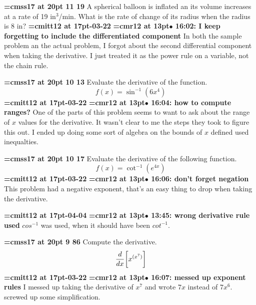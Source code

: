 {\medskip\noindent\bf\font\titlefont=cmss17 at 20pt 11 19}\medskip
A spherical balloon is inflated an its volume increases
at a rate of 19 in$^3$/min. What is the rate of change of its
radius when the radius is 8 in?
{\medskip\noindent\bf\font\titlefont=cmitt12 at 17pt-03-22}\medskip
{\smallskip\noindent\bf\font\titlefont=cmr12 at 13pt\titlefont $\bullet$ 16:02: I keep forgetting to include the differentiated component}\smallskip
In both the sample problem an the actual problem, I forgot about the second differential component when taking the derivative. I just treated it as the power rule on a variable, not the chain rule.
\par

{\medskip\noindent\bf\font\titlefont=cmss17 at 20pt 10 13}\medskip
Evaluate the derivative of the function.
$$\
f(x) = \sin^{-1}(6x^4)
$$
{\medskip\noindent\bf\font\titlefont=cmitt12 at 17pt-03-22}\medskip
{\smallskip\noindent\bf\font\titlefont=cmr12 at 13pt\titlefont $\bullet$ 16:04: how to compute ranges?}\smallskip
One of the parts of this problem seems to want to ask about the range of $x$ values for the derivative. It wasn't clear to me the steps they took to figure this out. I ended up doing some sort of algebra on the bounds of $x$ defined used inequalties.
\par

{\medskip\noindent\bf\font\titlefont=cmss17 at 20pt 10 17}\medskip
Evaluate the derivative of the following function.
$$\
f(x) = \cot^{-1}(e^{4x})
$$
{\medskip\noindent\bf\font\titlefont=cmitt12 at 17pt-03-22}\medskip
{\smallskip\noindent\bf\font\titlefont=cmr12 at 13pt\titlefont $\bullet$ 16:06: don't forget negation}\smallskip
This problem had a negative exponent, that's an easy thing to drop when taking the derivative.
\par

{\medskip\noindent\bf\font\titlefont=cmitt12 at 17pt-04-04}\medskip
{\smallskip\noindent\bf\font\titlefont=cmr12 at 13pt\titlefont $\bullet$ 13:45: wrong derivative rule used}\smallskip
$cos^{-1}$ was used, when it should have been $cot^{-1}$.
\par

{\medskip\noindent\bf\font\titlefont=cmss17 at 20pt 9 86}\medskip
Compute the derivative.
$$\
{d \over dx} \bigg[
x^{(x^7)}
\bigg]
$$
{\medskip\noindent\bf\font\titlefont=cmitt12 at 17pt-03-22}\medskip
{\smallskip\noindent\bf\font\titlefont=cmr12 at 13pt\titlefont $\bullet$ 16:07: messed up exponent rules}\smallskip
I messed up taking the derivative of $x^7$ and wrote $7x$ instead of $7x^6$. screwed up some simplification.
\par

